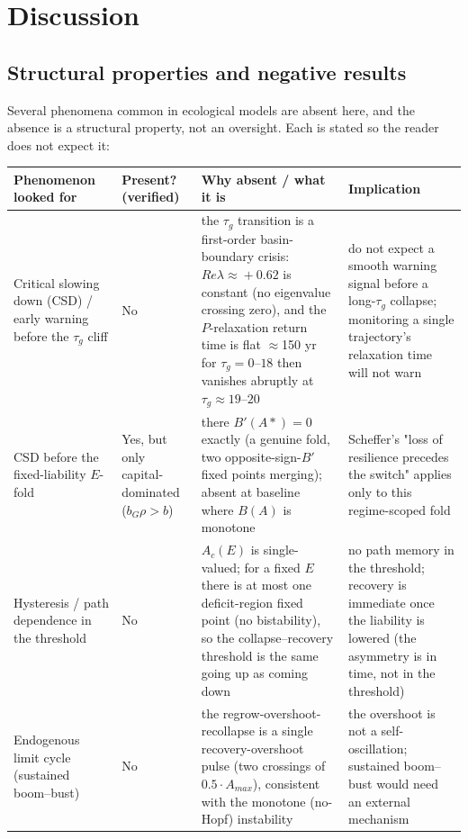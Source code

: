 \documentclass[11pt]{article}
\begin{document}
\section{Discussion}

\subsection{Structural properties and negative results}

Several phenomena common in ecological models are absent here, and the absence is a structural property, not an oversight. Each is stated so the reader does not expect it:

\begin{table}[htbp]
\centering
\small
\begin{tabularx}{\textwidth}{>{\raggedright\arraybackslash}X>{\raggedright\arraybackslash}X>{\raggedright\arraybackslash}X>{\raggedright\arraybackslash}X}
\toprule
Phenomenon looked for & Present? (verified) & Why absent / what it is & Implication \\
\midrule
Critical slowing down (CSD) / early warning before the $\tau{}_{g}$ cliff & No & the $\tau{}_{g}$ transition is a first-order basin-boundary crisis: $Re \lambda{} \approx{} +0.62$ is constant (no eigenvalue crossing zero), and the $P$-relaxation return time is flat \ensuremath{\approx{}}150 yr for $\tau{}_{g}=0–18$ then vanishes abruptly at $\tau{}_{g}\approx{}19–20$ & do not expect a smooth warning signal before a long-$\tau{}_{g}$ collapse; monitoring a single trajectory's relaxation time will not warn \\
CSD before the fixed-liability $E$-fold & Yes, but only capital-dominated ($b_{G}\rho{}>b$) & there $B'(A*)=0$ exactly (a genuine fold, two opposite-sign-$B'$ fixed points merging); absent at baseline where $B(A)$ is monotone & Scheffer's "loss of resilience precedes the switch" applies only to this regime-scoped fold \\
Hysteresis / path dependence in the threshold & No & $A_{c}(E)$ is single-valued; for a fixed $E$ there is at most one deficit-region fixed point (no bistability), so the collapse–recovery threshold is the same going up as coming down & no path memory in the threshold; recovery is immediate once the liability is lowered (the asymmetry is in time, not in the threshold) \\
Endogenous limit cycle (sustained boom–bust) & No & the regrow-overshoot-recollapse is a single recovery-overshoot pulse (two crossings of $0.5\cdot{}A_{max}$), consistent with the monotone (no-Hopf) instability & the overshoot is not a self-oscillation; sustained boom–bust would need an external mechanism \\

\end{tabularx}
\end{table}
\end{document}
